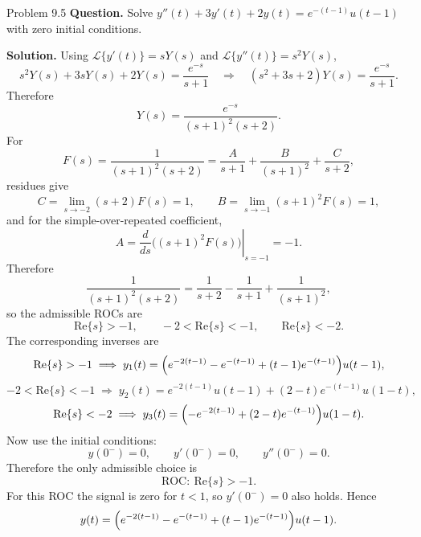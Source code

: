 \documentclass[10pt]{article}
\newcommand{\ROC}{\mathrm{ROC}}
\newcommand{\LT}{\mathcal{L}}
\newcommand{\Prompt}[1]{\textbf{Question.} #1}
\newcommand{\SketchLabel}{\tcblower\textbf{Solution.}}
\begin{document}
\begin{examplebox}{Problem 9.5}
  \Prompt{Solve \(y''(t)+3y'(t)+2y(t)=e^{-(t-1)}u(t-1)\) with zero initial conditions.}

  \medskip
  \SketchLabel{}
  Using \(\LT\{y'(t)\}=sY(s)\) and \(\LT\{y''(t)\}=s^2Y(s)\),
  \[
    s^2Y(s)+3sY(s)+2Y(s)=\frac{e^{-s}}{s+1}
    \quad \Longrightarrow \quad
    (s^2+3s+2)Y(s)=\frac{e^{-s}}{s+1}.
  \]
  Therefore
  \[
    Y(s)=\frac{e^{-s}}{(s+1)^2(s+2)}.
  \]
  For
  \[
    F(s)=\frac{1}{(s+1)^2(s+2)}
    =\frac{A}{s+1}+\frac{B}{(s+1)^2}+\frac{C}{s+2},
  \]
  residues give
  \[
    C=\lim_{s\to-2}(s+2)F(s)=1,
    \qquad
    B=\lim_{s\to-1}(s+1)^2F(s)=1,
  \]
  and for the simple-over-repeated coefficient,
  \[
    A=\left.\frac{d}{ds}\Big((s+1)^2F(s)\Big)\right|_{s=-1}=-1.
  \]
  Therefore
  \[
    \frac{1}{(s+1)^2(s+2)}=\frac{1}{s+2}-\frac{1}{s+1}+\frac{1}{(s+1)^2},
  \]
  so the admissible ROCs are
  \[
    \text{Re}\{s\}>-1,\qquad -2<\text{Re}\{s\}<-1,\qquad \text{Re}\{s\}<-2.
  \]
  The corresponding inverses are
  \[
    \text{Re}\{s\}>-1
    \;\Longrightarrow\;
    y_1(t)=\Bigl(e^{-2(t-1)}-e^{-(t-1)}+(t-1)e^{-(t-1)}\Bigr)u(t-1),
  \]
  \[
    -2<\text{Re}\{s\}<-1
    \;\Longrightarrow\;
    y_2(t)=e^{-2(t-1)}u(t-1)+(2-t)e^{-(t-1)}u(1-t),
  \]
  \[
    \text{Re}\{s\}<-2
    \;\Longrightarrow\;
    y_3(t)=\Bigl(-e^{-2(t-1)}+(2-t)e^{-(t-1)}\Bigr)u(1-t).
  \]
  Now use the initial conditions:
  \[
    y(0^-)=0,\qquad y'(0^-)=0,\qquad y''(0^-)=0.
  \]
  Therefore the only admissible choice is
  \[
    \ROC:\ \text{Re}\{s\}>-1.
  \]
  For this ROC the signal is zero for \(t<1\), so \(y'(0^-)=0\) also holds. Hence
  \[
    y(t)=\Bigl(e^{-2(t-1)}-e^{-(t-1)}+(t-1)e^{-(t-1)}\Bigr)u(t-1).
  \]


\end{examplebox}
\end{document}
